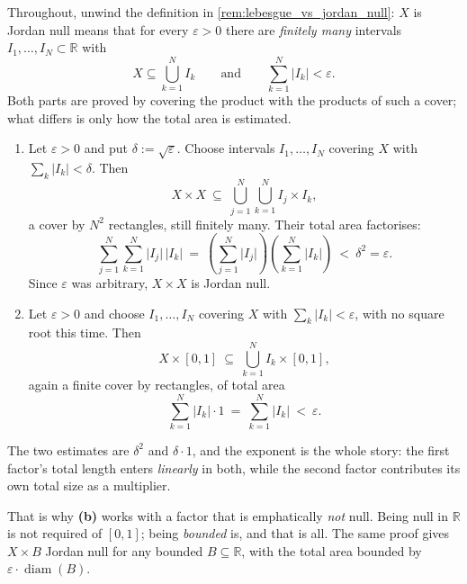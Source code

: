 \begin{exercisesolution}
\label{sol:jordan_null_products}
Throughout, unwind the definition in \cref{rem:lebesgue_vs_jordan_null}: $X$ is Jordan null means
that for every $\varepsilon > 0$ there are \emph{finitely many} intervals
$I_1,\dots,I_N \subset \mathbb{R}$ with
\[X \subseteq \bigcup_{k=1}^N I_k \qquad\text{and}\qquad \sum_{k=1}^N \lvert I_k\rvert < \varepsilon.\]
Both parts are proved by covering the product with the products of such a cover; what differs is
only how the total area is estimated.

\begin{enumerate}[label=\textbf{(\alph*)}]
  \item Let $\varepsilon > 0$ and put $\delta := \sqrt{\varepsilon}$. Choose intervals
    $I_1,\dots,I_N$ covering $X$ with $\sum_k\lvert I_k\rvert < \delta$. Then
    \[X \times X \ \subseteq\ \bigcup_{j=1}^N\bigcup_{k=1}^N I_j \times I_k,\]
    a cover by $N^2$ rectangles, still finitely many. Their total area factorises:
    \[\sum_{j=1}^N\sum_{k=1}^N \lvert I_j\rvert\,\lvert I_k\rvert
      \ =\ \left(\sum_{j=1}^N \lvert I_j\rvert\right)\!\left(\sum_{k=1}^N \lvert I_k\rvert\right)
      \ <\ \delta^2 = \varepsilon .\]
    Since $\varepsilon$ was arbitrary, $X\times X$ is Jordan null.

  \item Let $\varepsilon > 0$ and choose $I_1,\dots,I_N$ covering $X$ with
    $\sum_k\lvert I_k\rvert < \varepsilon$, with no square root this time. Then
    \[X \times [0,1] \ \subseteq\ \bigcup_{k=1}^N I_k \times [0,1],\]
    again a finite cover by rectangles, of total area
    \[\sum_{k=1}^N \lvert I_k\rvert \cdot 1 \ =\ \sum_{k=1}^N\lvert I_k\rvert \ <\ \varepsilon .\]
\end{enumerate}

\begin{remark}
\label{rem:jordan_null_products}
The two estimates are $\delta^2$ and $\delta\cdot1$, and the exponent is the whole story: the
first factor's total length enters \emph{linearly} in both, while the second factor contributes
its own total size as a multiplier.

That is why \textbf{(b)} works with a factor that is emphatically \emph{not} null. Being null in
$\mathbb{R}$ is not required of $[0,1]$; being \emph{bounded} is, and that is all. The same proof
gives $X \times B$ Jordan null for any bounded $B \subseteq \mathbb{R}$, with the total area
bounded by $\varepsilon \cdot \operatorname{diam}(B)$.


\end{remark}
\end{exercisesolution}
